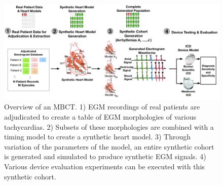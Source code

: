 \begin{figure}[tb]
	\vspace{-10pt}
	\centering
	\includegraphics[scale=0.3]{figures/figMBCToverview}
	\vspace{-10pt}
	\caption{Overview of an \ac{MBCT}. 1) \ac{EGM} recordings of real patients are adjudicated to create a table of \ac{EGM} morphologies of various tachycardias. 2) Subsets of these morphologies are combined with a timing model to create a synthetic heart model. 3) Through variation of the parameters of the model, an entire synthetic cohort is generated and simulated to produce synthetic \ac{EGM} signals. 4) Various device evaluation experiments can be executed with this synthetic cohort.}
	\vspace{-10pt}
	\label{fig:mbct overview}
\end{figure}


